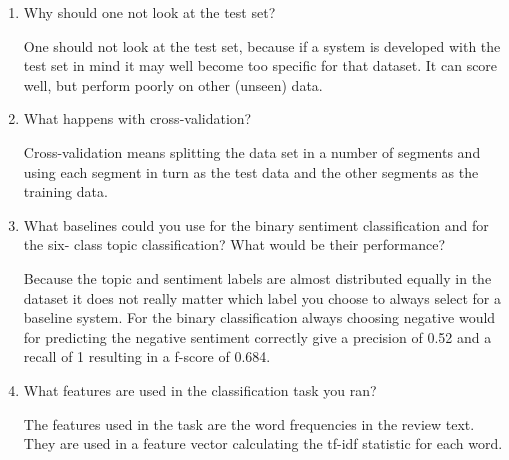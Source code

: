 \documentclass[11pt]{article}
\begin{document}
\begin{enumerate}

\item Why should one not look at the test set?

One should not look at the test set, because if a system is developed with the test set in mind it may well become too specific for that dataset. It can score well, but perform poorly on other (unseen) data.

\item What happens with cross-validation?

Cross-validation means splitting the data set in a number of segments and using each segment in turn as the test data and the other segments as the training data.

\item What baselines could you use for the binary sentiment classification and for the six- class topic classification? What would be their performance?

Because the topic and sentiment labels are almost distributed equally in the dataset it does not really matter which label you choose to always select for a baseline system. For the binary classification always choosing negative would for predicting the negative sentiment correctly give a precision of 0.52 and a recall of 1 resulting in a f-score of 0.684.

\item What features are used in the classification task you ran?

The features used in the task are the word frequencies in the review text. They are used in a feature vector calculating the tf-idf statistic for each word.

\end{enumerate}



\end{document}
